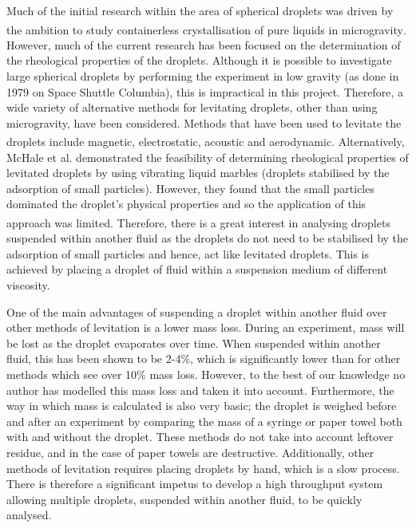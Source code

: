\documentclass{physics_article_B}
\begin{document}
    Much of the initial research within the area of spherical droplets was driven by the ambition to study containerless crystallisation of pure liquids in microgravity\textsuperscript{\cite{wilkes}}. However, much of the current research has been focused on the determination of the rheological properties of the droplets. Although it is possible to investigate large spherical droplets by performing the experiment in low gravity (as done in 1979\cite{holt} on Space Shuttle Columbia), this is impractical in this project. Therefore, a wide variety of alternative methods for levitating droplets, other than using microgravity, have been considered. Methods that have been used to levitate the droplets include magnetic\textsuperscript{\cite{temperton, hill}}, electrostatic\textsuperscript{\cite{mugele, wong}}, acoustic\textsuperscript{\cite{trinh, Yarin1998}} and aerodynamic\textsuperscript{\cite{benmore}}. Alternatively, McHale et al. demonstrated the feasibility of determining rheological properties of levitated droplets by using vibrating liquid marbles (droplets stabilised by the adsorption of small particles). However, they found that the small particles dominated the droplet's physical properties and so the application of this approach was limited\textsuperscript{\cite{mchale}}. Therefore, there is a great interest in analysing droplets suspended within another fluid as the droplets do not need to be stabilised by the adsorption of small particles and hence, act like levitated droplets. This is achieved by placing a droplet of fluid within a suspension medium of different viscosity. 
    
    One of the main advantages of suspending a droplet within another fluid over other methods of levitation is a lower mass loss. During an experiment, mass will be lost as the droplet evaporates over time. When suspended within another fluid, this has been shown to be 2-4\%, which is significantly lower than for other methods which see over 10\% \cite{harrold2} mass loss. However, to the best of our knowledge no author has modelled this mass loss and taken it into account. Furthermore, the way in which mass is calculated is also very basic; the droplet is weighed before and after an experiment by comparing the mass of a syringe or paper towel both with and without the droplet. These methods do not take into account leftover residue, and in the case of paper towels are destructive. Additionally, other methods of levitation requires placing droplets by hand, which is a slow process. There is therefore a significant impetus to develop a high throughput system allowing multiple droplets, suspended within another fluid, to be quickly analysed.
\end{document}
